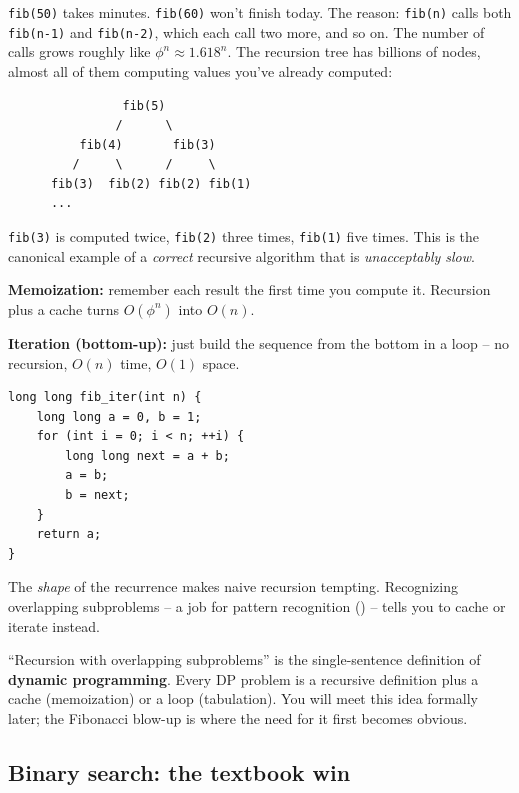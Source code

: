 \documentclass[11pt]{article}
\begin{document}
\begin{warnbox}
\texttt{fib(50)} takes minutes. \texttt{fib(60)} won't finish today.
The reason: \texttt{fib(n)} calls both \texttt{fib(n-1)} and
\texttt{fib(n-2)}, which each call two more, and so on. The number of
calls grows roughly like $\phi^n \approx 1.618^n$. The recursion tree
has billions of nodes, almost all of them computing values you've
already computed:
\begin{verbatim}
                fib(5)
               /      \
          fib(4)       fib(3)
         /     \      /     \
      fib(3)  fib(2) fib(2) fib(1)
      ...
\end{verbatim}
\texttt{fib(3)} is computed twice, \texttt{fib(2)} three times,
\texttt{fib(1)} five times. This is the canonical example of a
\emph{correct} recursive algorithm that is \emph{unacceptably slow}.
\end{warnbox}

\begin{ideabox}
\textbf{Memoization:} remember each result the first time you compute
it. Recursion plus a cache turns $O(\phi^n)$ into $O(n)$.

\textbf{Iteration (bottom-up):} just build the sequence from the
bottom in a loop -- no recursion, $O(n)$ time, $O(1)$ space.
\begin{verbatim}
long long fib_iter(int n) {
    long long a = 0, b = 1;
    for (int i = 0; i < n; ++i) {
        long long next = a + b;
        a = b;
        b = next;
    }
    return a;
}
\end{verbatim}
The \emph{shape} of the recurrence makes naive recursion tempting.
Recognizing overlapping subproblems -- a job for pattern recognition
(\textsection 2.3) -- tells you to cache or iterate instead.
\end{ideabox}

\begin{notebox}
``Recursion with overlapping subproblems'' is the single-sentence
definition of \textbf{dynamic programming}. Every DP problem is a
recursive definition plus a cache (memoization) or a loop (tabulation).
You will meet this idea formally later; the Fibonacci blow-up is
where the need for it first becomes obvious.
\end{notebox}

\subsection{Binary search: the textbook win}
\end{document}
